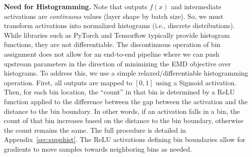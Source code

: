 

{\bf Need for Histogramming.} 
{\color{blue} Note that outputs $f(x)$ and intermediate activations are \textit{continuous} values (layer shape by batch size).}
So, we must transform activations into normalized histograms (i.e., discrete distributions).
While libraries such as PyTorch and Tensorflow typically provide histogram functions, they are not differentiable. The discontinuous operation of bin assignment does not allow for an end-to-end pipeline where we can push upstream parameters in the direction of minimizing the EMD objective over histograms.
To address this, we 
use a simple relaxed/differentiable histogramming operation. 
First, all outputs are mapped to $[0,1]$ using a Sigmoid activation. Then, for each bin location, the ``count'' in that bin is determined by a ReLU function applied to the difference between the gap between the activation and the distance to the bin boundary. In other words, if an activation falls in a bin, the count of that bin increases based on the distance to the bin boundary, otherwise the count remains the same.
The full procedure is detailed in Appendix~\ref{sec:supphist}.
The ReLU activations defining bin boundaries allow for gradients to move samples towards neighboring bins as needed.

